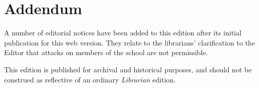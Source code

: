 \documentclass[10pt,a4paper]{article}
\begin{document}
\section{Addendum}

\begin{multicols}{2}
	A number of editorial notices have been added to this edition after its initial publication for this web version. They relate to the librarians' clarification to the Editor that attacks on members of the school are not permissible. 
	
	This edition is published for archival and historical purposes, and should not be construed as reflective of an ordinary \textit{Librarian} edition. 
\end{multicols}
\end{document}
